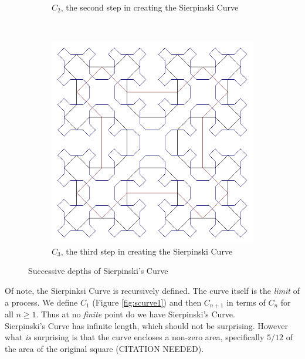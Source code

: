 \documentclass[11pt,oneside,final]{article}
\begin{document}
\begin{figure}[hb]
\begin{subfigure}[b]{0.3\textwidth}
		\caption{\(C_2\), the second step in creating the Sierpinski Curve}
		\label{fig:scurve2}
	\end{subfigure}
	~
	\begin{subfigure}[b]{0.3\textwidth}
		\includegraphics[width=\textwidth]{Sierpinski-Curve-3}
		\caption{\(C_3\), the third step in creating the Sierpinski Curve}
		\label{fig:scurve3}
	\end{subfigure}
	\caption{Successive depths of Sierpinski's Curve}\label{fig:scurve}
\end{figure}

Of note, the Sierpinksi Curve is recursively defined. The curve itself is the
{\em limit} of a process. We define \(C_1\) (Figure \ref{fig:scurve1}) and then
\(C_{n+1}\) in terms of \(C_n\) for all \(n \geq 1\). Thus at no {\em finite}
point do we have Sierpinski's Curve.\\

Sierpinski's Curve has infinite length, which should not be surprising. However
what {\em is} surprising is that the curve encloses a non-zero area, specifically
\(5/12\) of the area of the original square (CITATION NEEDED).\\
\end{document}
